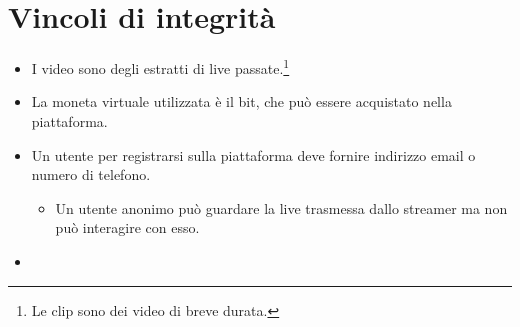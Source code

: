 \section{Vincoli di integrità}
\begin{itemize}
    \item I video sono degli estratti di live passate.\footnote{Le clip sono dei video di breve durata.}
    \item La moneta virtuale utilizzata è il bit, che può essere acquistato nella piattaforma.
    \item Un utente per registrarsi sulla piattaforma deve fornire indirizzo email o numero di telefono.
    \begin{itemize}
        \item Un utente anonimo può guardare la live trasmessa dallo streamer ma non può interagire con esso. 
    \end{itemize}
        \item 
\end{itemize}